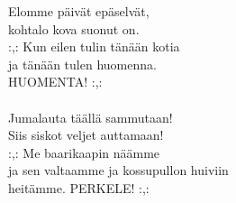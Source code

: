 
            Elomme päivät epäselvät, \\
            kohtalo kova suonut on. \\
            :,: Kun eilen tulin tänään kotia \\
            ja tänään tulen huomenna. \\
            HUOMENTA! :,: \\
\hspace{10mm} \\
            Jumalauta täällä sammutaan! \\
            Siis siskot veljet auttamaan! \\
            :,: Me baarikaapin näämme \\
            ja sen valtaamme ja kossupullon huiviin \\
            heitämme. PERKELE! :,: \\
